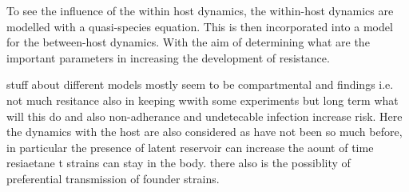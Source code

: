 \documentclass[DIV=15]{scrartcl}
\begin{document}










To see the influence of  the within host dynamics, the within-host dynamics are modelled with a quasi-species equation. This is then incorporated into a model for the between-host dynamics. With the aim of determining what are the important parameters in increasing the development of resistance.





\iffalse
stuff about different models mostly seem to be compartmental and findings i.e. not much resitance also in keeping wwith some experiments but long term what will this do and also non-adherance and undetecable infection increase risk. Here the dynamics with the host are also considered as have not been so much before, in particular the presence of  latent reservoir  can increase the aount of time resiaetane t strains can stay in the body. there also is the possiblity of preferential transmission of founder strains.
\end{document}
